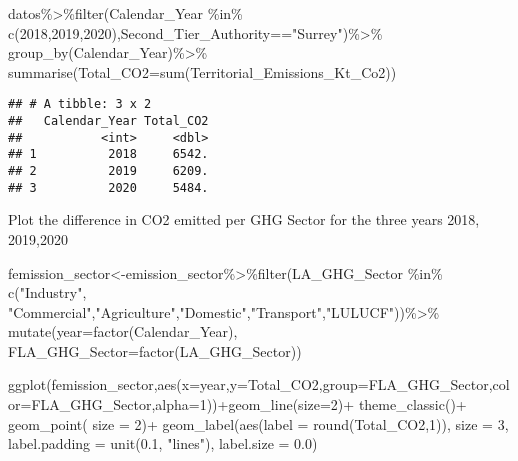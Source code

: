\documentclass[
]{article}
\newenvironment{Shaded}{\begin{snugshade}}{\end{snugshade}}
\newcommand{\AttributeTok}[1]{\textcolor[rgb]{0.77,0.63,0.00}{#1}}
\newcommand{\DecValTok}[1]{\textcolor[rgb]{0.00,0.00,0.81}{#1}}
\newcommand{\FloatTok}[1]{\textcolor[rgb]{0.00,0.00,0.81}{#1}}
\newcommand{\FunctionTok}[1]{\textcolor[rgb]{0.00,0.00,0.00}{#1}}
\newcommand{\NormalTok}[1]{#1}
\newcommand{\OtherTok}[1]{\textcolor[rgb]{0.56,0.35,0.01}{#1}}
\newcommand{\SpecialCharTok}[1]{\textcolor[rgb]{0.00,0.00,0.00}{#1}}
\newcommand{\StringTok}[1]{\textcolor[rgb]{0.31,0.60,0.02}{#1}}
\begin{document}
\begin{Shaded}
\begin{Highlighting}[]
\NormalTok{datos}\SpecialCharTok{\%\textgreater{}\%}\FunctionTok{filter}\NormalTok{(Calendar\_Year }\SpecialCharTok{\%in\%} \FunctionTok{c}\NormalTok{(}\DecValTok{2018}\NormalTok{,}\DecValTok{2019}\NormalTok{,}\DecValTok{2020}\NormalTok{),Second\_Tier\_Authority}\SpecialCharTok{==}\StringTok{"Surrey"}\NormalTok{)}\SpecialCharTok{\%\textgreater{}\%}
               \FunctionTok{group\_by}\NormalTok{(Calendar\_Year)}\SpecialCharTok{\%\textgreater{}\%}
               \FunctionTok{summarise}\NormalTok{(}\AttributeTok{Total\_CO2=}\FunctionTok{sum}\NormalTok{(Territorial\_Emissions\_Kt\_Co2)) }
\end{Highlighting}
\end{Shaded}

\begin{verbatim}
## # A tibble: 3 x 2
##   Calendar_Year Total_CO2
##           <int>     <dbl>
## 1          2018     6542.
## 2          2019     6209.
## 3          2020     5484.
\end{verbatim}

Plot the difference in CO2 emitted per GHG Sector for the three years
2018, 2019,2020

\begin{Shaded}
\begin{Highlighting}[]
\NormalTok{femission\_sector}\OtherTok{\textless{}{-}}\NormalTok{emission\_sector}\SpecialCharTok{\%\textgreater{}\%}\FunctionTok{filter}\NormalTok{(LA\_GHG\_Sector }\SpecialCharTok{\%in\%} \FunctionTok{c}\NormalTok{(}\StringTok{"Industry"}\NormalTok{, }\StringTok{"Commercial"}\NormalTok{,}\StringTok{"Agriculture"}\NormalTok{,}\StringTok{"Domestic"}\NormalTok{,}\StringTok{"Transport"}\NormalTok{,}\StringTok{"LULUCF"}\NormalTok{))}\SpecialCharTok{\%\textgreater{}\%} \FunctionTok{mutate}\NormalTok{(}\AttributeTok{year=}\FunctionTok{factor}\NormalTok{(Calendar\_Year), }\AttributeTok{FLA\_GHG\_Sector=}\FunctionTok{factor}\NormalTok{(LA\_GHG\_Sector))}

\FunctionTok{ggplot}\NormalTok{(femission\_sector,}\FunctionTok{aes}\NormalTok{(}\AttributeTok{x=}\NormalTok{year,}\AttributeTok{y=}\NormalTok{Total\_CO2,}\AttributeTok{group=}\NormalTok{FLA\_GHG\_Sector,}\AttributeTok{color=}\NormalTok{FLA\_GHG\_Sector,}\AttributeTok{alpha=}\DecValTok{1}\NormalTok{))}\SpecialCharTok{+}\FunctionTok{geom\_line}\NormalTok{(}\AttributeTok{size=}\DecValTok{2}\NormalTok{)}\SpecialCharTok{+}
    \FunctionTok{theme\_classic}\NormalTok{()}\SpecialCharTok{+}
    \FunctionTok{geom\_point}\NormalTok{( }\AttributeTok{size =} \DecValTok{2}\NormalTok{)}\SpecialCharTok{+} \FunctionTok{geom\_label}\NormalTok{(}\FunctionTok{aes}\NormalTok{(}\AttributeTok{label =} \FunctionTok{round}\NormalTok{(Total\_CO2,}\DecValTok{1}\NormalTok{)), }
             \AttributeTok{size =} \DecValTok{3}\NormalTok{, }
             \AttributeTok{label.padding =} \FunctionTok{unit}\NormalTok{(}\FloatTok{0.1}\NormalTok{, }\StringTok{"lines"}\NormalTok{), }
             \AttributeTok{label.size =} \FloatTok{0.0}\NormalTok{)}
\end{Highlighting}
\end{Shaded}
\end{document}
